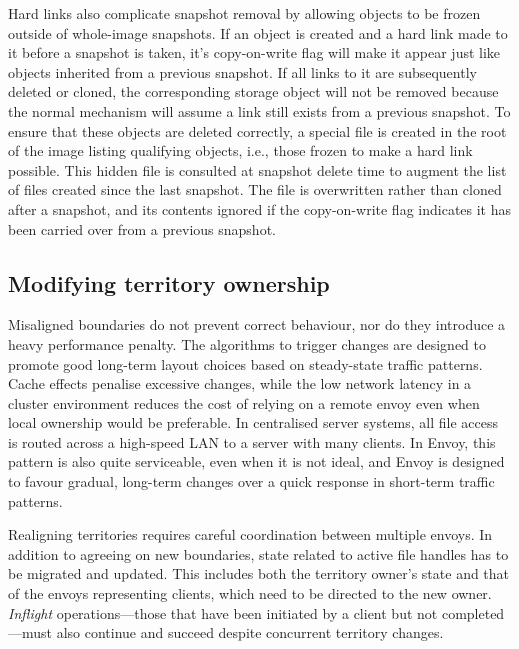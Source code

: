 Hard links also complicate snapshot removal by allowing objects to be frozen outside of whole-image snapshots. If an object is created and a hard link made to it before a snapshot is taken, it's copy-on-write flag will make it appear just like objects inherited from a previous snapshot. If all links to it are subsequently deleted or cloned, the corresponding storage object will not be removed because the normal mechanism will assume a link still exists from a previous snapshot. To ensure that these objects are deleted correctly, a special file is created in the root of the image listing qualifying objects, i.e., those frozen to make a hard link possible. This hidden file is consulted at snapshot delete time to augment the list of files created since the last snapshot. The file is overwritten rather than cloned after a snapshot, and its contents ignored if the copy-on-write flag indicates it has been carried over from a previous snapshot.

\subsection{Modifying territory ownership}

Misaligned boundaries do not prevent correct behaviour, nor do they introduce a heavy performance penalty. The algorithms to trigger changes are designed to promote good long-term layout choices based on steady-state traffic patterns. Cache effects penalise excessive changes, while the low network latency in a cluster environment reduces the cost of relying on a remote envoy even when local ownership would be preferable. In centralised server systems, all file access is routed across a high-speed LAN to a server with many clients. In Envoy, this pattern is also quite serviceable, even when it is not ideal, and Envoy is designed to favour gradual, long-term changes over a quick response in short-term traffic patterns.

Realigning territories requires careful coordination between multiple envoys. In addition to agreeing on new boundaries, state related to active file handles has to be migrated and updated. This includes both the territory owner's state and that of the envoys representing clients, which need to be directed to the new owner. \emph{Inflight} operations---those that have been initiated by a client but not completed---must also continue and succeed despite concurrent territory changes.

